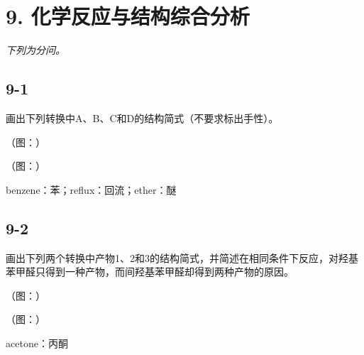 \section*{9. 化学反应与结构综合分析}
\textit{下列为分问。}

\subsection*{9-1}
画出下列转换中A、B、C和D的结构简式（不要求标出⼿性）。

（图：）

（图：）

benzene：苯；reflux：回流；ether：醚

\subsection*{9-2}
画出下列两个转换中产物1、2和3的结构简式，并简述在相同条件下反应，对羟基苯甲醛只得到⼀种产物，⽽间羟基苯甲醛却得到两种产物的原因。

（图：）

（图：）

acetone：丙酮
